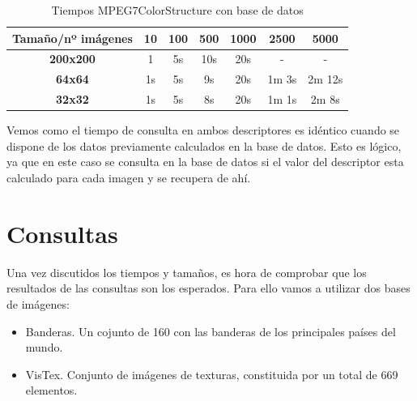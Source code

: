 \begin{table}[H]
\centering
\begin{tabular}{|c|c|c|c|c|c|c|}
\hline
\textbf{Tamaño/nº imágenes} & \textbf{10} & \textbf{100} & \textbf{500} & \textbf{1000} & \textbf{2500} & \textbf{5000} \\ \hline
\textbf{200x200}            & 1           & 5s           & 10s          & 20s           & -             & -             \\ \hline
\textbf{64x64}              & 1s          & 5s           & 9s           & 20s           & 1m 3s         & 2m 12s        \\ \hline
\textbf{32x32}              & 1s          & 5s           & 8s           & 20s           & 1m 1s         & 2m 8s         \\ \hline
\end{tabular}
\caption{Tiempos MPEG7ColorStructure con base de datos}
\label{my-label}
\end{table}

Vemos como el tiempo de consulta en ambos descriptores es idéntico cuando se dispone de los datos previamente calculados en la base de datos. Esto es lógico, ya que en este caso se consulta en la base de datos si el valor del descriptor esta calculado para cada imagen y se recupera de ahí.


\section{Consultas}

Una vez discutidos los tiempos y tamaños, es hora de comprobar que los resultados de las consultas son los esperados. Para ello vamos a utilizar dos bases de imágenes:\\

\begin{itemize}

\item Banderas. Un cojunto de 160 con las banderas de los principales países del mundo.

\item VisTex. Conjunto de imágenes de texturas, constituida por un total de 669 elementos.

\end{itemize}

